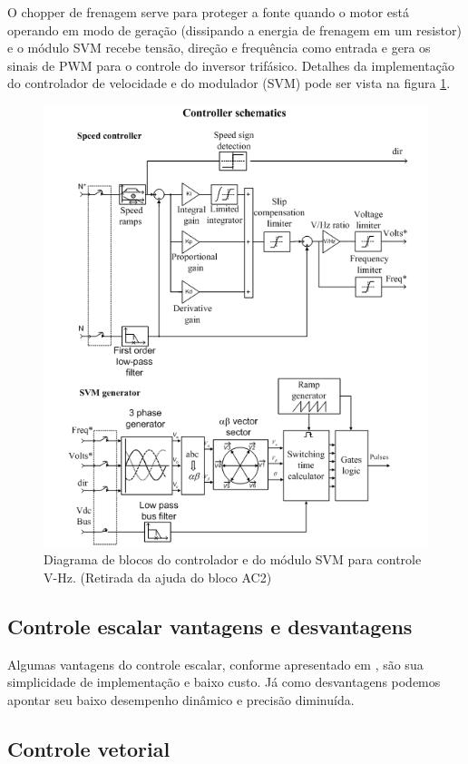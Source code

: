 \documentclass{article}
\begin{document}
O chopper de frenagem serve para proteger a fonte quando o motor está operando em modo de geração (dissipando a energia de frenagem em um resistor) e o módulo SVM recebe tensão, direção e frequência como entrada e gera os sinais de PWM para o controle do inversor trifásico.
Detalhes da implementação do controlador de velocidade e do modulador (SVM) pode ser vista na figura \ref{fig:esqC}.
\begin{figure}[H]
	\centering
	\includegraphics[width=\linewidth]{esqC}
	\caption{Diagrama de blocos do controlador e do módulo SVM para controle V-Hz. (Retirada da ajuda do bloco AC2)}
	\label{fig:esqC}
\end{figure}

\subsection{Controle escalar vantagens e desvantagens}
Algumas vantagens do controle escalar, conforme apresentado em \cite{bb:fodor}, são sua simplicidade de implementação e baixo custo. Já como desvantagens podemos apontar seu baixo desempenho dinâmico e precisão diminuída.
\subsection{Controle vetorial}

\end{document}
